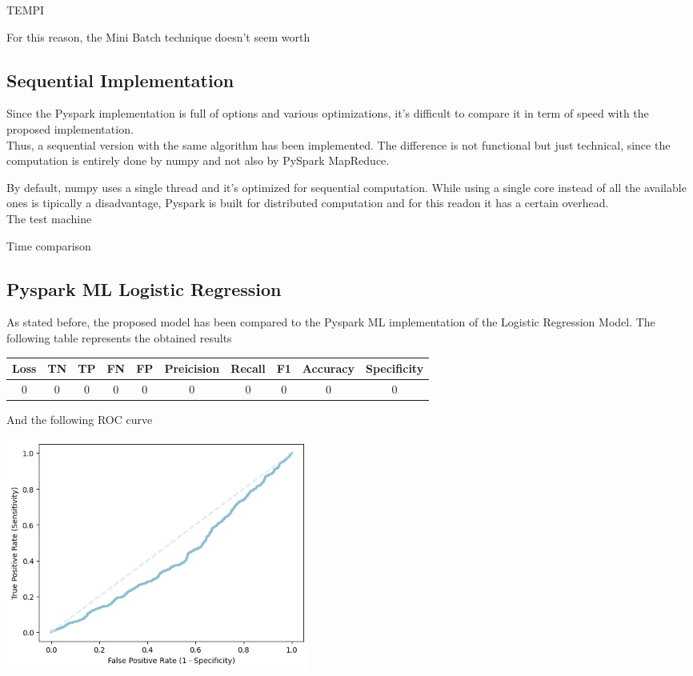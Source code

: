 \documentclass[
	letterpaper, %
	10pt, %
]{class}
\begin{document}
TEMPI

For this reason, the Mini Batch technique doesn't seem worth

\subsection{Sequential Implementation}

Since the Pyspark implementation is full of options and various optimizations, it's difficult to compare it in term of speed with the proposed implementation.\\
Thus, a sequential version with the same algorithm has been implemented. The difference is not functional but just technical, since the computation is entirely done by numpy and not also by PySpark MapReduce.

By default, numpy uses a single thread and it's optimized for sequential computation. While using a single core instead of all the available ones is tipically a disadvantage, Pyspark is built for distributed computation and for this readon it has a certain overhead.\\
The test machine

Time comparison

\subsection{Pyspark ML Logistic Regression}

As stated before, the proposed model has been compared to the Pyspark ML implementation of the Logistic Regression Model.
The following table represents the obtained results

\begin{center}
    \begin{tabular}{ |c|c|c|c|c|c|c|c|c|c| }
        \hline
        Loss & TN & TP & FN & FP & Preicision & Recall & F1 & Accuracy & Specificity \\
        \hline
        0    & 0  & 0  & 0  & 0  & 0          & 0      & 0  & 0        & 0           \\
        \hline
    \end{tabular}
\end{center}

And the following ROC curve

\begin{center}
    \includegraphics[width=10cm]{../images/ml_logistic.png}
\end{center}
\end{document}
